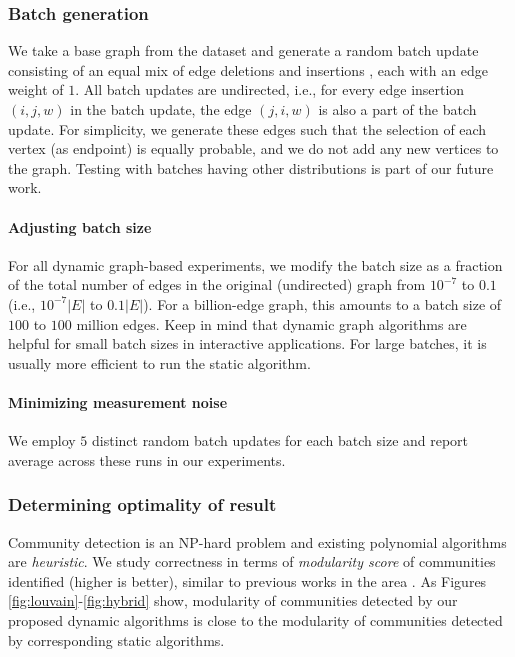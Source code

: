 \subsubsection{Batch generation}
\label{sec:batch-update}

We take a base graph from the dataset and generate a random batch update \cite{com-zarayeneh21} consisting of an equal mix of edge deletions and insertions \cite{com-chong13}, each with an edge weight of $1$. All batch updates are undirected, i.e., for every edge insertion $(i, j, w)$ in the batch update, the edge $(j, i, w)$ is also a part of the batch update. For simplicity, we generate these edges such that the selection of each vertex (as endpoint) is equally probable, and we do not add any new vertices to the graph. Testing with batches having other distributions is part of our future work.




\paragraph{Adjusting batch size}

For all dynamic graph-based experiments, we modify the batch size as a fraction of the total number of edges in the original (undirected) graph from $10^{-7}$ to $0.1$ (i.e., $10^{-7}|E|$ to $0.1|E|$). For a billion-edge graph, this amounts to a batch size of $100$ to $100$ million edges. Keep in mind that dynamic graph algorithms are helpful for small batch sizes in interactive applications. For large batches, it is usually more efficient to run the static algorithm.

\paragraph{Minimizing measurement noise}

We employ $5$ distinct random batch updates for each batch size and report average across these runs in our experiments.


\subsubsection{Determining optimality of result}
\label{sec:evaluation--optimality}

Community detection is an NP-hard problem and existing polynomial algorithms are \textit{heuristic}. We study correctness in terms of \textit{modularity score} of communities identified (higher is better), similar to previous works in the area \cite{com-traag19, com-zarayeneh21}. As Figures \ref{fig:louvain}-\ref{fig:hybrid} show, modularity of communities detected by our proposed dynamic algorithms is close to the modularity of communities detected by corresponding static algorithms.

